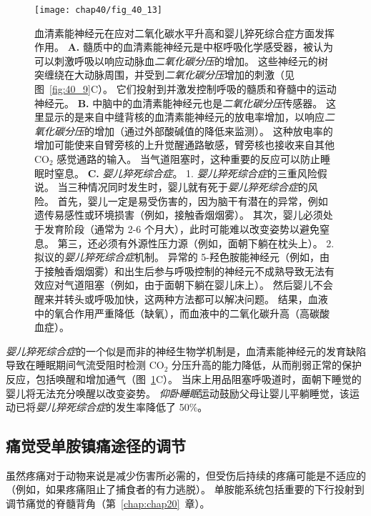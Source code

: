 \begin{figure}[htbp]
	\centering
	\texttt{[image: chap40/fig\_40\_13]}
	\caption{血清素能神经元在应对二氧化碳水平升高和婴儿猝死综合症方面发挥作用。
		\textbf{A.} 髓质中的血清素能神经元是中枢呼吸化学感受器，被认为可以刺激呼吸以响应动脉血\textit{二氧化碳分压}的增加。
		这些神经元的树突缠绕在大动脉周围，并受到\textit{二氧化碳分压}增加的刺激（见图~\ref{fig:40_9}C）。
		它们投射到并激发控制呼吸的髓质和脊髓中的运动神经元。
		\textbf{B.} 中脑中的血清素能神经元也是\textit{二氧化碳分压}传感器。
		这里显示的是来自中缝背核的血清素能神经元的放电率增加，以响应\textit{二氧化碳分压}的增加（通过外部酸碱值的降低来监测）。
		这种放电率的增加可能使来自臂旁核的上升觉醒通路敏感，臂旁核也接收来自其他 CO$_2$ 感觉通路的输入。
		当气道阻塞时，这种重要的反应可以防止睡眠时窒息\cite{richerson2004serotonergic}。
		\textbf{C.} \textit{婴儿猝死综合症}。 1. \textit{婴儿猝死综合症}的三重风险假说。
		当三种情况同时发生时，婴儿就有死于\textit{婴儿猝死综合症}的风险。
		首先，婴儿一定是易受伤害的，因为脑干有潜在的异常，例如遗传易感性或环境损害（例如，接触香烟烟雾）。 其次，婴儿必须处于发育阶段（通常为 2-6 个月大），此时可能难以改变姿势以避免窒息。
		第三，还必须有外源性压力源（例如，面朝下躺在枕头上）\cite{filiano1994perspective}。
		2. 拟议的\textit{婴儿猝死综合症}机制。
		异常的 5-羟色胺能神经元（例如，由于接触香烟烟雾）和出生后参与呼吸控制的神经元不成熟导致无法有效应对气道阻塞（例如，由于面朝下躺在婴儿床上）。
		然后婴儿不会醒来并转头或呼吸加快，这两种方法都可以解决问题。
		结果，血液中的氧合作用严重降低（缺氧），而血液中的二氧化碳升高（高碳酸血症）。}
	\label{fig:40_13}
\end{figure}


\textit{婴儿猝死综合症}的一个似是而非的神经生物学机制是，血清素能神经元的发育缺陷导致在睡眠期间气流受阻时检测 CO$_2$ 分压升高的能力降低，从而削弱正常的保护反应，包括唤醒和增加通气（图~\ref{fig:40_13}C）。
当床上用品阻塞呼吸道时，面朝下睡觉的婴儿将无法充分唤醒以改变姿势。
\textit{仰卧睡眠}运动鼓励父母让婴儿平躺睡觉，该运动已将\textit{婴儿猝死综合症}的发生率降低了 50\%。



\subsection{痛觉受单胺镇痛途径的调节}

虽然疼痛对于动物来说是减少伤害所必需的，但受伤后持续的疼痛可能是不适应的（例如，如果疼痛阻止了捕食者的有力逃脱）。
单胺能系统包括重要的下行投射到调节痛觉的脊髓背角（第~\ref{chap:chap20}~章）。


